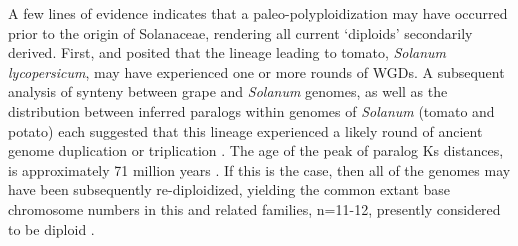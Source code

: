 
A few lines of evidence indicates that a paleo-polyploidization may have occurred prior to the origin of Solanaceae, rendering all current `diploids' secondarily derived. 
First, \citet{ku2000} and \citet{blanc2004} posited that the lineage leading to tomato, \textit{Solanum lycopersicum}, may have experienced one or more rounds of WGDs.
A subsequent analysis of synteny between grape and \textit{Solanum} genomes, as well as the distribution between inferred paralogs within genomes of \textit{Solanum} (tomato and potato) each suggested that this lineage experienced a likely round of ancient genome duplication or triplication \citep{tomato2012}. 
The age of the peak of paralog Ks distances, is approximately 71 million years \citep{tomato2012}. 
If this is the case, then all of the genomes may have been subsequently re-diploidized, yielding the common extant base chromosome numbers in this and related families, n=11-12, presently considered to be diploid \citep{robertson_2011}. 

